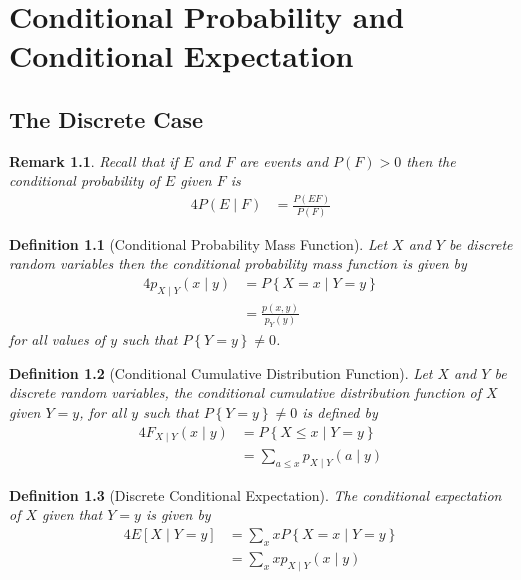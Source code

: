 \documentclass[11pt, oneside]{book}   	%
\newtheorem{definition}{Definition}[chapter]
\newtheorem{remark}{Remark}[chapter]
\newcommand{\set}[1]{\left\{#1\right\}}
\begin{document}
\chapter{Conditional Probability and Conditional Expectation}

\section{The Discrete Case}

\begin{remark}
	Recall that if $E$ and $F$ are events and $P(F)>0$ then the conditional probability of $E$ given $F$ is 
	\begin{alignat}{4}
		P(E\mid F)&=\frac{P(EF)}{P(F)}
	\end{alignat}
\end{remark}

\begin{definition}[Conditional Probability Mass Function]
	Let $X$ and $Y$ be discrete random variables then the \emph{conditional probability mass function} is given by 
	\begin{alignat}{4}
		p_{X\mid Y}(x\mid y)&=P\set{X=x\mid Y=y} \\
			&=\frac{p(x, y)}{p_Y(y)}
	\end{alignat}
	for all values of $y$ such that $P\set{Y=y}\neq 0$. 
\end{definition}

\begin{definition}[Conditional Cumulative Distribution Function]
	Let $X$ and $Y$ be discrete random variables, the \emph{conditional cumulative distribution function} of $X$ given $Y=y$, for all $y$ such that $P\set{Y=y}\neq 0$ is defined by 
	\begin{alignat}{4}
		F_{X\mid Y}(x\mid y)&=P\set{X\leq x\mid Y=y} \\
			&=\sum_{a\leq x}p_{X\mid Y}(a\mid y)
	\end{alignat}
\end{definition}

\begin{definition}[Discrete Conditional Expectation]
	The \emph{conditional expectation} of $X$ given that $Y=y$ is given by 
	\begin{alignat}{4}
		E[X\mid Y=y]&=\sum_{x}xP\set{X=x\mid Y=y} \\
			&=\sum_{x} xp_{X\mid Y}(x\mid y)
	\end{alignat}
\end{definition}
\end{document}
